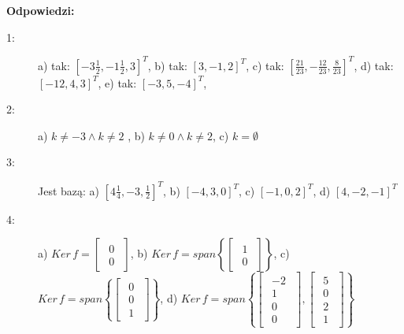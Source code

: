 \documentclass{article}
\begin{document}
\newpage
\textbf{Odpowiedzi:}
\begin{description}
    \item [1:] a) tak: $[-3\frac{1}{2}, -1\frac{1}{2}, 3]^{T}$, b) tak: $[3,-1,2]^{T}$,  c) tak: $[\frac{21}{23},-\frac{12}{23},\frac{8}{23}]^{T}$, d) tak: $[-12,4,3]^{T}$, e) tak: $[-3,5,-4]^{T}$,
    
    \item [2:] a) $k \neq -3 \wedge k \neq 2$ , b) $k \neq 0 \wedge k \neq 2$, c) $k = \emptyset$
    
    \item [3:] Jest bazą: a) $[4\frac{1}{4},-3,\frac{1}{2}]^{T}$, b) $[-4,3,0]^{T}$, c) $[-1,0,2]^{T}$, d) $[4,-2,-1]^{T}$
    
    \item [4:] a) $Ker\,f = \begin{bmatrix}\begin{array}{r} 0\\ 0 \end{array}\end{bmatrix}$, b) $Ker\,f=span\left\{ \begin{bmatrix}\begin{array}{r} 1\\ 0 \end{array}\end{bmatrix}  \right\}$, c) $Ker\,f=span\left\{ \begin{bmatrix}\begin{array}{r} 0\\ 0\\ 1 \end{array}\end{bmatrix}  \right\}$, d) $Ker\,f=span\left\{ \begin{bmatrix}\begin{array}{r} -2\\ 1\\ 0\\ 0 \end{array}\end{bmatrix}, \begin{bmatrix}\begin{array}{r} 5\\ 0\\ 2\\ 1 \end{array}\end{bmatrix}  \right\}$
    

\end{description}
\end{document}
